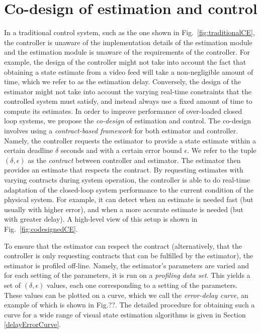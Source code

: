 \section{Co-design of estimation and control}
\label{sec:codesign}

In a traditional control system, such as the one shown in Fig.~\ref{fig:traditionalCE}, the controller is unaware of the implementation details of the estimation module and the estimation module is unaware of the requirements of the controller.
For example, the design of the controller might not take into account the fact that obtaining a state estimate from a video feed will take a non-negligible amount of time, which we refer to as the estimation delay.
Conversely, the design of the estimator might not take into account the varying real-time constraints that the controlled system must satisfy, and instead always use a fixed amount of time to compute its estimates.
In order to improve performance of over-loaded closed loop systems, we propose the \emph{co-design} of estimation and control.
The co-design involves using a \emph{contract-based framework} for both estimator and controller.
Namely, the controller requests the estimator to provide a state estimate within a certain deadline $\delta$ seconds and with a certain error bound $\epsilon$.
We refer to the tuple $(\delta,\epsilon)$ as the \emph{contract} between controller and estimator.
The estimator then provides an estimate that respects the contract.
By requesting estimates with varying contracts during system operation, the controller is able to do real-time adaptation of the closed-loop system performance to the current condition of the physical system.
For example, it can detect when an estimate is needed fast (but usually with higher error), and when a more accurate estimate is needed (but with greater delay).
A high-level view of this setup is shown in Fig.~\ref{fig:codesignedCE}.

To ensure that the estimator can respect the contract (alternatively, that the controller is only requesting contracts that can be fulfilled by the estimator), the estimator is profiled off-line.
Namely, the estimator's parameters are varied and for each setting of the parameters, it is run on a \emph{profiling data set}.
This yields a set of $(\delta,\epsilon)$ values, each one corresponding to a setting of the parameters.
These values can be plotted on a curve, which we call the \emph{error-delay curve}, an example of which is shown in Fig.??.
The detailed procedure for obtaining such a curve for a wide range of visual state estimation algorithms is given in Section \ref{delayErrorCurve}.

